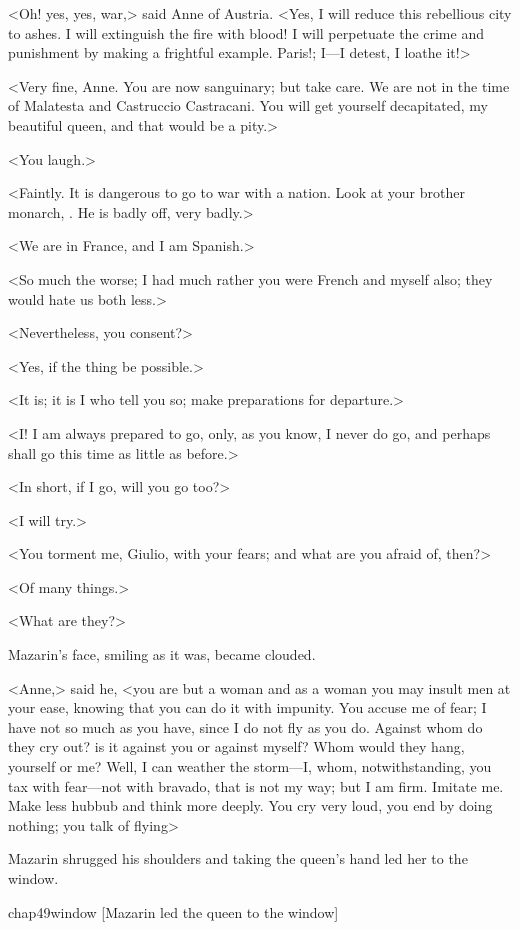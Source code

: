 <Oh! yes, yes, war,> said Anne of Austria. <Yes, I will reduce this rebellious city to ashes. I will extinguish the fire with blood! I will perpetuate the crime and punishment by making a frightful example. Paris!; I—I detest, I loathe it!>

<Very fine, Anne. You are now sanguinary; but take care. We are not in the time of Malatesta and Castruccio Castracani. You will get yourself decapitated, my beautiful queen, and that would be a pity.>

<You laugh.>

<Faintly. It is dangerous to go to war with a nation. Look at your brother monarch, .  He is badly off, very badly.>

<We are in France, and I am Spanish.>

<So much the worse; I had much rather you were French and myself also; they would hate us both less.>

<Nevertheless, you consent?>

<Yes, if the thing be possible.>

<It is; it is I who tell you so; make preparations for departure.>

<I\@! I am always prepared to go, only, as you know, I never do go, and perhaps shall go this time as little as before.>

<In short, if I go, will you go too?>

<I will try.>

<You torment me, Giulio, with your fears; and what are you afraid of, then?>

<Of many things.>

<What are they?>

Mazarin's face, smiling as it was, became clouded.

<Anne,> said he, <you are but a woman and as a woman you may insult men at your ease, knowing that you can do it with impunity. You accuse me of fear; I have not so much as you have, since I do not fly as you do. Against whom do they cry out? is it against you or against myself? Whom would they hang, yourself or me? Well, I can weather the storm—I, whom, notwithstanding, you tax with fear—not with bravado, that is not my way; but I am firm. Imitate me. Make less hubbub and think more deeply. You cry very loud, you end by doing nothing; you talk of flying\longdash>

Mazarin shrugged his shoulders and taking the queen's hand led her to the window.

\begin{bwbigpic}
	[\basicscale] 
	{chap49window}
	[Mazarin led the queen to the window]
\end{bwbigpic}


